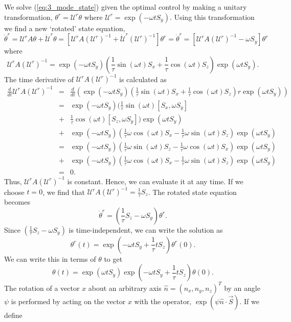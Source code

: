 We solve (\ref{eq:3_mode_state}) given the optimal control by making a unitary transformation, $\theta^{r}=\mathcal{U}^{r}\theta$ where $\mathcal{U}^{r}=\exp(-\omega t S_{y})$. Using this transformation we find a new `rotated' state equation,
\[
	\dot{\theta}^{r}=\mathcal{U}^{r}A\theta+\dot{\mathcal{U}}^{r}\theta=[\mathcal{U}^{r}A(\mathcal{U}^{r})^{-1} +\dot{\mathcal{U}}^{r}(\mathcal{U}^{r})^{-1}]\theta^{r} =
	\dot{\theta}^{r}=[\mathcal{U}^{r}A(\mathcal{U}^{r})^{-1} -\omega S_{y}]\theta^{r}
\]
where
\[
	\mathcal{U}^{r}A(\mathcal{U}^{r})^{-1}=\exp(-\omega t S_{y})\left(\frac{1}{\tau}\sin(\omega t)S_{x}+\frac{1}{\tau}\cos(\omega t) S_{z}\right)\exp(\omega t S_{y}).
\]
The time derivative of $\mathcal{U}^{r}A(\mathcal{U}^{r})^{-1}$ is calculated as
\begin{eqnarray*}
	\frac{d}{dt}\mathcal{U}^{r}A(\mathcal{U}^{r})^{-1}&=&\frac{d}{dt}\left(\exp(-\omega t S_{y})\left(\frac{1}{\tau}\sin(\omega t)S_{x}+\frac{1}{\tau}\cos(\omega t) S_{z}\right)r\exp(\omega t S_{y})\right) \\
	&=&\exp(-\omega t S_{y})\Bigg(\frac{1}{\tau}\sin(\omega t)[S_{x},\omega S_{y}] \\ &+&\frac{1}{\tau}\cos(\omega t) [S_{z},\omega S_{y}]\Bigg)\exp(\omega t S_{y})\\
	&+&\exp(-\omega t S_{y})\left(\frac{1}{\tau}\omega\cos(\omega t)S_{x}-\frac{1}{\tau}\omega\sin(\omega t)S_{z}\right)\exp(\omega t S_{y})\\
	&=&\exp(-\omega t S_{y})\left(\frac{1}{\tau}\omega\sin(\omega t)S_{z}-\frac{1}{\tau}\omega\cos(\omega t) S_{x} \right)\exp(\omega t S_{y})\\
	&+&\exp(-\omega t S_{y})\left(\frac{1}{\tau}\omega\cos(\omega t)S_{x}-\frac{1}{\tau}\omega\sin(\omega t)S_{z}\right)\exp(\omega t S_{y})\\
	&=& 0.
\end{eqnarray*}
Thus, $\mathcal{U}^{r}A(\mathcal{U}^{r})^{-1}$ is constant. Hence, we can evaluate it at any time. If we choose $t=0$, we find that $\mathcal{U}^{r}A(\mathcal{U}^{r})^{-1}= \frac{1}{\tau} S_{z}$. The rotated state equation becomes
\[
	\dot{\theta}^{r}=\left(\frac{1}{\tau} S_{z} -\omega S_{y}\right)\theta^{r}.
\]
Since $\left(\frac{1}{\tau} S_{z} -\omega S_{y}\right)$ is time-independent, we can write the solution as
\[
	\theta^{r}(t)=\exp\left(-\omega t S_{y}+ \frac{1}{\tau} t S_{z}\right)\theta^{r}(0).
\]
We can write this in terms of $\theta$ to get
\[
	\theta(t)=\exp(\omega t S_{y})\exp(-\omega t S_{y}+\frac{1}{\tau} t S_{z})\theta(0).
\]
The rotation of a vector $x$ about an arbitrary axis $\hat{n}=(n_{x},n_{y}, n_{z})^{T}$ by an angle $\psi$ is performed by acting on the vector $x$ with the operator, $\exp( \psi  \hat{n}\cdot \vec{S})$. If we define

